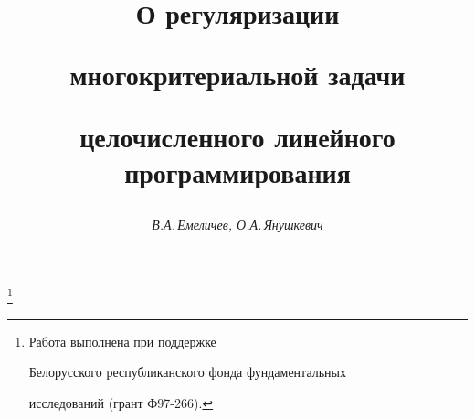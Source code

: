 




% 





\newcommand{\tts}[1]{}







\setcounter{page}{38}















\author{\it В.А.\,Емеличев, О.А.\,Янушкевич}




\title{О регуляризации


многокритериальной задачи


целочисленного линейного программирования}


\thanks{Работа выполнена при поддержке


Белорусского республиканского фонда фундаментальных


исследований (грант Ф97-266).}





\date{}




\pagestyle{plain} %







